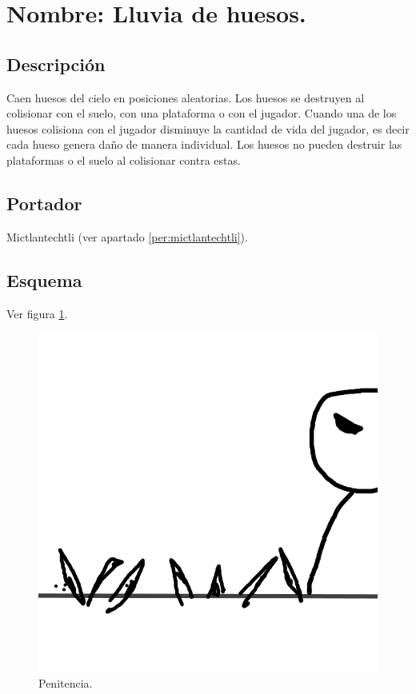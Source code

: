 \section{Nombre: Lluvia de huesos.}\label{hab.LluHuesos}
\subsection{Descripción}
Caen huesos del cielo en posiciones aleatorias. Los huesos se destruyen al colisionar con el suelo, con una plataforma o con el jugador. Cuando una de los huesos colisiona con el jugador disminuye la cantidad de vida del jugador, es decir cada hueso genera daño de manera individual. Los huesos no pueden destruir las plataformas o el suelo al colisionar contra estas.
\subsection{Portador}
Mictlantechtli (ver apartado \ref{per:mictlantechtli}).	
\subsection{Esquema}
			Ver figura \ref{fig:penitencia}.
			\begin{figure}
				\centering
				\includegraphics[height=0.2 \textheight]{Imagenes/penitencia}
				\caption{Penitencia.}
				\label{fig:penitencia}
			\end{figure}
			
